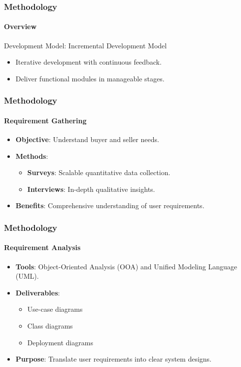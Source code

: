 \documentclass{beamer}
\begin{document}
\begin{frame}
	\frametitle{Methodology}
	\framesubtitle{Overview}
	Development Model: Incremental Development Model
	\begin{itemize}
		\item Iterative development with continuous feedback.
		\item Deliver functional modules in manageable stages.
	\end{itemize}
\end{frame}

\begin{frame}
	\frametitle{Methodology}
	\framesubtitle{Requirement Gathering}
	\begin{itemize}
		\item \textbf{Objective}: Understand buyer and seller needs.
		\item \textbf{Methods}:
		      \begin{itemize}
			      \item \textbf{Surveys}: Scalable quantitative data collection.
			      \item \textbf{Interviews}: In-depth qualitative insights.
		      \end{itemize}
		\item \textbf{Benefits}: Comprehensive understanding of user requirements.
	\end{itemize}
\end{frame}

\begin{frame}
	\frametitle{Methodology}
	\framesubtitle{Requirement Analysis}
	\begin{itemize}
		\item \textbf{Tools}: Object-Oriented Analysis (OOA) and Unified Modeling Language
		      (UML).
		\item \textbf{Deliverables}:
		      \begin{itemize}
			      \item Use-case diagrams
			      \item Class diagrams
			      \item Deployment diagrams
		      \end{itemize}
		\item \textbf{Purpose}: Translate user requirements into clear system designs.
	\end{itemize}
\end{frame}
\end{document}
